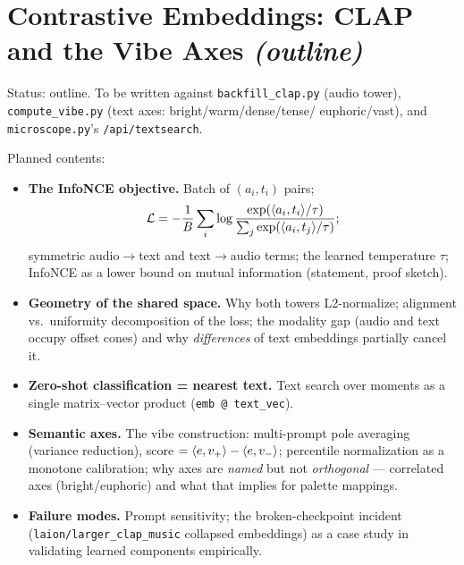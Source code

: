 \chapter{Contrastive Embeddings: CLAP and the Vibe Axes \emph{(outline)}}\label{ch:contrastive}

\begin{incode}
Status: outline. To be written against \texttt{backfill\_clap.py} (audio
tower), \texttt{compute\_vibe.py} (text axes: bright/warm/dense/tense/%
euphoric/vast), and \texttt{microscope.py}'s \texttt{/api/textsearch}.
\end{incode}

Planned contents:
\begin{itemize}
  \item \textbf{The InfoNCE objective.} Batch of $(a_i, t_i)$ pairs;
  \[
  \mathcal{L} = -\frac{1}{B}\sum_i \log
  \frac{\exp(\langle a_i, t_i\rangle/\tau)}{\sum_j \exp(\langle a_i, t_j\rangle/\tau)} ;
  \]
  symmetric audio$\to$text and text$\to$audio terms; the learned temperature
  $\tau$; InfoNCE as a lower bound on mutual information (statement, proof
  sketch).
  \item \textbf{Geometry of the shared space.} Why both towers L2-normalize;
  alignment vs.\ uniformity decomposition of the loss; the modality gap
  (audio and text occupy offset cones) and why \emph{differences} of text
  embeddings partially cancel it.
  \item \textbf{Zero-shot classification = nearest text.} Text search over
  moments as a single matrix--vector product (\texttt{emb @ text\_vec}).
  \item \textbf{Semantic axes.} The vibe construction: multi-prompt pole
  averaging (variance reduction), score $= \langle e, v_+\rangle - \langle e, v_-\rangle$;
  percentile normalization as a monotone calibration; why axes are
  \emph{named} but not \emph{orthogonal} --- correlated axes (bright/euphoric)
  and what that implies for palette mappings.
  \item \textbf{Failure modes.} Prompt sensitivity; the broken-checkpoint
  incident (\texttt{laion/larger\_clap\_music} collapsed embeddings) as a
  case study in validating learned components empirically.
\end{itemize}
